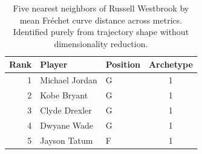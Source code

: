 \begin{table}[htbp]
  \centering\small
  \begin{tabular}{rllc}
    \toprule
    Rank & Player & Position & Archetype \\
    \midrule
    1 & Michael Jordan & G & 1 \\
    2 & Kobe Bryant & G & 1 \\
    3 & Clyde Drexler & G & 1 \\
    4 & Dwyane Wade & G & 1 \\
    5 & Jayson Tatum & F & 1 \\
    \bottomrule
  \end{tabular}
  \caption{Five nearest neighbors of Russell Westbrook by mean Fr\'{e}chet curve distance across metrics. Identified purely from trajectory shape without dimensionality reduction.}
  \label{tab:Russell_Westbrook_frechet_curve_neighbors}
\end{table}

